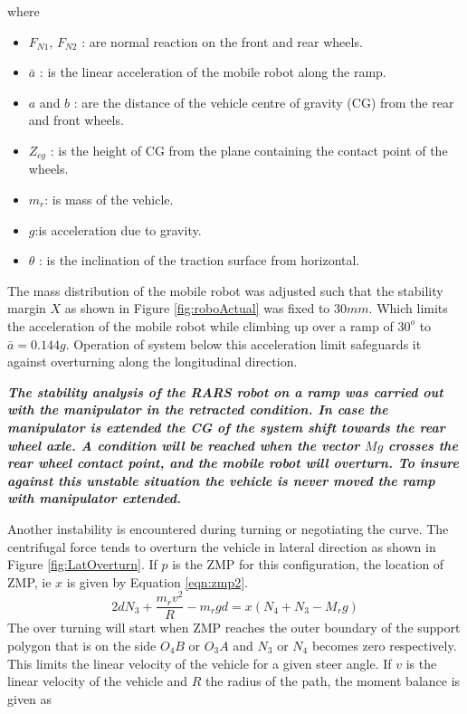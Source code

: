 where 
\begin{itemize}
\item[] $F_{N1}$, $F_{N2}$ : are normal reaction on the front and rear wheels.
\item [] $\bar a$ : is the linear acceleration of the mobile robot along the ramp.
\item[] $a$ and $b$ : are the distance of the vehicle centre of gravity (CG) from the rear and front wheels.
\item [] $Z_{cg}$ : is the height of  CG from the  plane containing the contact point of the wheels.
\item [] $m_r$: is mass of the vehicle.
\item [] $g$:is acceleration due to gravity.
\item[] $\theta$ : is the inclination of the traction surface from horizontal.
\end{itemize}
The mass distribution of the mobile robot was  adjusted such that the stability margin $X$ as shown in Figure \ref{fig:roboActual} was fixed to $30mm$. Which  limits  the acceleration of the mobile robot while climbing up  over a ramp of $30^o$ to $\bar a=0.144g$. Operation of system below this acceleration limit safeguards it against overturning along the longitudinal direction. 

\textbf{\textit{The stability analysis of the RARS robot on a ramp  was carried out with the manipulator in the retracted condition. In case the manipulator is extended  the CG of the system shift towards the rear wheel axle. A condition will be reached when the vector $Mg$ crosses the rear wheel contact point, and the mobile robot will overturn. To insure against this unstable situation the vehicle is never moved the ramp with manipulator extended.}} 
   
Another instability is encountered during turning or negotiating the curve. The centrifugal force tends to overturn the vehicle in lateral direction as shown in Figure \ref{fig:LatOverturn}.
If $p$ is the ZMP for this configuration, the location of ZMP, ie $x$ is given by Equation \ref{eqn:zmp2}. 
\begin{equation}
\label{eqn:zmp2}
2dN_3+ \frac{m_r v^2}{R}-m_r g d=x(N_4+N_3-M_r g)
\end{equation}
The over turning will start when ZMP reaches the outer boundary of the support polygon that is on the side $O_4B$ or $O_3A$ and $N_3$ or $N_4$ becomes zero respectively.
This limits the linear velocity of the vehicle for a given steer angle. If $v$ is the linear velocity of the vehicle and $R$ the radius of the path, the moment balance is given as

